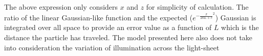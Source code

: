 %

The above expression only considers $x$ and $z$ for simplicity of calculation.
The ratio of the linear Gaussian-like function and the expected ($e^{-\frac{x}{2kL+c}^2}$) Gaussian is integrated over all space to provide an error value as a function of $L$ which is the distance the particle has traveled.
The model presented here also does not take into consideration the variation of illumination across the light-sheet %

